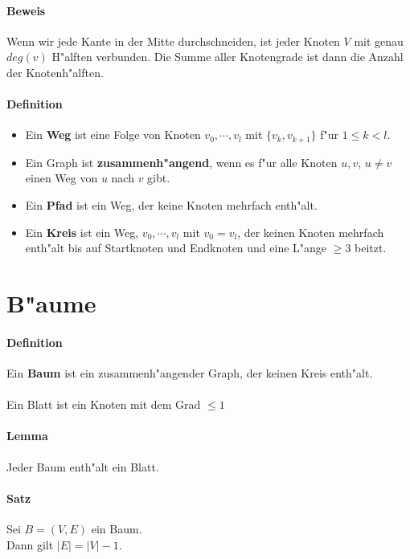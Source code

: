 \paragraph{Beweis} \parskp
Wenn wir jede Kante in der Mitte durchschneiden, ist jeder Knoten $V$ mit genau $deg(v)$ H"alften verbunden.
Die Summe aller Knotengrade ist dann die Anzahl der Knotenh"alften.

\paragraph{Definition}
\begin{itemize}
    \item Ein \textbf{Weg} ist eine Folge von Knoten $v_0,\cdots,v_l$ mit $\{v_k,v_{k+1}\}$ f"ur $1\le k<l$.
    \item Ein Graph ist \textbf{zusammenh"angend}, wenn es f"ur alle Knoten $u,v$, $u\ne v$ einen Weg von $u$
          nach $v$ gibt.
    \item Ein \textbf{Pfad} ist ein Weg, der keine Knoten mehrfach enth"alt.
    \item Ein \textbf{Kreis} ist ein Weg, $v_0,\cdots,v_l$ mit $v_0=v_l$, der keinen Knoten mehrfach enth"alt
          bis auf Startknoten und Endknoten und eine L"ange $\ge3$ beitzt.
\end{itemize}

\section{B"aume}

\paragraph{Definition} \parskp
Ein \textbf{Baum} ist ein zusammenh"angender Graph, der keinen Kreis enth"alt.\\
\\
Ein Blatt ist ein Knoten mit dem Grad $\le1$

\paragraph{Lemma} Jeder Baum enth"alt ein Blatt.

\paragraph{Satz} Sei $B=(V,E)$ ein Baum. \\
Dann gilt $|E|=|V|-1$.

